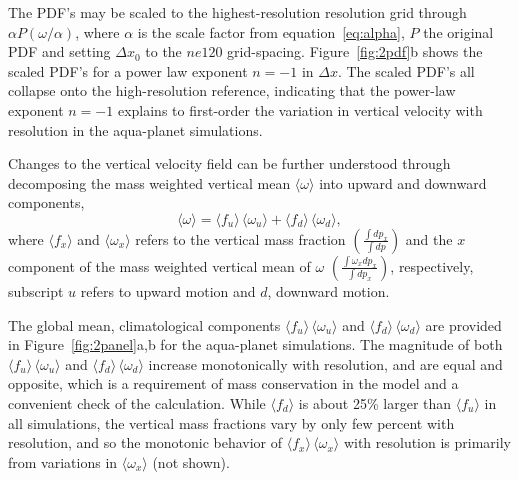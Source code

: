 \documentclass[times]{qjrms4}
\begin{document}
The PDF's may be scaled to the highest-resolution resolution grid through $ \alpha P (\omega / \alpha)$, where $\alpha$ is the scale factor from equation~\ref{eq:alpha}, $P$ the original PDF and setting $\Delta x_0$ to the $ne120$ grid-spacing. Figure~\ref{fig:2pdf}b shows the scaled PDF's for a power law exponent $n=-1$ in $\Delta x$. The scaled PDF's all collapse onto the high-resolution reference, indicating that the power-law exponent $n=-1$ explains to first-order the variation in vertical velocity with resolution in the aqua-planet simulations. 

Changes to the vertical velocity field can be further understood through decomposing the mass weighted vertical mean $ \langle \omega \rangle$ into upward and downward components,
\begin{equation}
\langle \omega \rangle =\langle f_{u} \rangle \, \langle \omega_{u} \rangle + \langle f_{d} \rangle \, \langle \omega_{d} \rangle, \label{eq:omega}
\end{equation}
where $\langle f_x \rangle$ and $\langle \omega_x \rangle$ refers to the vertical mass fraction $ \left( \frac{\int dp_x}{\int dp} \right)$ and the $x$ component of the mass weighted vertical mean of $\omega$ $ \left( \frac{\int \omega_x dp_x}{\int dp_x} \right)$, respectively, subscript $u$ refers to upward motion and $d$, downward motion.

The global mean, climatological components $\langle f_{u} \rangle \, \langle \omega_{u} \rangle$ and $\langle f_{d} \rangle \, \langle \omega_{d} \rangle$ are provided in Figure~\ref{fig:2panel}a,b for the aqua-planet simulations. The magnitude of both $\langle f_{u} \rangle \, \langle \omega_{u} \rangle$ and $\langle f_{d} \rangle \, \langle \omega_{d} \rangle$ increase monotonically with resolution, and are equal and opposite, which is a requirement of mass conservation in the model and a convenient check of the calculation. While $\langle f_{d} \rangle$ is about 25\% larger than $\langle f_{u} \rangle$ in all simulations, the vertical mass fractions vary by only few percent with resolution, and so the monotonic behavior of $\langle f_{x} \rangle \, \langle \omega_{x} \rangle$ with resolution is primarily from variations in $ \langle \omega_{x} \rangle$ (not shown).
\end{document}
